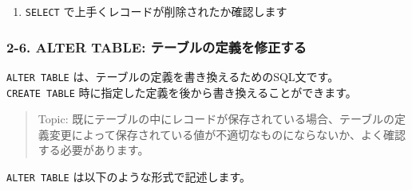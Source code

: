 \begin{enumerate}
\def\labelenumi{\arabic{enumi}.}
\setcounter{enumi}{1}
\tightlist
\item
  \texttt{SELECT} で上手くレコードが削除されたか確認します
\end{enumerate}

\begin{Shaded}
\begin{Highlighting}[]
 \OperatorTok{*} 
\end{Highlighting}
\end{Shaded}

\subsubsection{2-6. ALTER TABLE:
テーブルの定義を修正する}\label{alter-table-ux30c6ux30fcux30d6ux30ebux306eux5b9aux7fa9ux3092ux4feeux6b63ux3059ux308b}

\texttt{ALTER\ TABLE} は、テーブルの定義を書き換えるためのSQL文です。\\
\texttt{CREATE\ TABLE}
時に指定した定義を後から書き換えることができます。

\begin{quote}
Topic:
既にテーブルの中にレコードが保存されている場合、テーブルの定義変更によって保存されている値が不適切なものにならないか、よく確認する必要があります。
\end{quote}

\texttt{ALTER\ TABLE} は以下のような形式で記述します。

\begin{Shaded}
\begin{Highlighting}[]
 
 

 
 

 
 

 
 

 
 
\end{Highlighting}
\end{Shaded}

